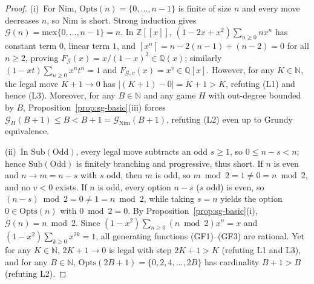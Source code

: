 \documentclass[11pt]{article}
\theoremstyle{definition}
\theoremstyle{remark}
\newcommand{\N}{\mathbb{N}}
\newcommand{\Z}{\mathbb{Z}}
\newcommand{\Q}{\mathbb{Q}}
\newcommand{\G}{\mathcal{G}}
\newcommand{\mex}{\mathrm{mex}}
\newcommand{\Opts}{\mathrm{Opts}}
\newcommand{\Sub}{\mathrm{Sub}}
\begin{document}
\begin{proof}
(i)~For Nim, $\Opts(n) = \{0,\dots,n-1\}$ is finite of size $n$ and every move decreases $n$, so Nim is short. Strong induction gives $\G(n) = \mex\{0,\dots,n-1\} = n$. In $\Z[[x]]$, $(1 - 2x + x^2)\sum_{n \ge 0} n x^n$ has constant term $0$, linear term $1$, and $[x^n] = n - 2(n-1) + (n-2) = 0$ for all $n \ge 2$, proving $F_{\G}(x) = x/(1-x)^2 \in \Q(x)$; similarly $(1-xt)\sum_{n \ge 0} x^n t^n = 1$ and $F_{\G,v}(x) = x^v \in \Q[x]$. However, for any $K \in \N$, the legal move $K+1 \to 0$ has $|(K+1)-0| = K+1 > K$, refuting (L1) and hence (L3). Moreover, for any $B \in \N$ and any game $H$ with out-degree bounded by $B$, Proposition~\ref{prop:sg-basic}(iii) forces $\G_H(B+1) \le B < B+1 = \G_{\mathrm{Nim}}(B+1)$, refuting (L2) even up to Grundy equivalence.

(ii)~In $\Sub(\mathrm{Odd})$, every legal move subtracts an odd $s \ge 1$, so $0 \le n - s < n$; hence $\Sub(\mathrm{Odd})$ is finitely branching and progressive, thus short. If $n$ is even and $n \to m = n - s$ with $s$ odd, then $m$ is odd, so $m \bmod 2 = 1 \neq 0 = n \bmod 2$, and no $v < 0$ exists. If $n$ is odd, every option $n - s$ ($s$ odd) is even, so $(n-s)\bmod 2 = 0 \neq 1 = n \bmod 2$, while taking $s = n$ yields the option $0 \in \Opts(n)$ with $0 \bmod 2 = 0$. By Proposition~\ref{prop:sg-basic}(i), $\G(n) = n \bmod 2$. Since $(1 - x^2)\sum_{n \ge 0} (n \bmod 2)x^n = x$ and $(1-x^2)\sum_{k \ge 0} x^{2k} = 1$, all generating functions (GF1)--(GF3) are rational. Yet for any $K \in \N$, $2K+1 \to 0$ is legal with step $2K+1 > K$ (refuting L1 and L3), and for any $B \in \N$, $\Opts(2B+1) = \{0,2,4,\dots,2B\}$ has cardinality $B+1 > B$ (refuting L2).
\end{proof}
\end{document}
